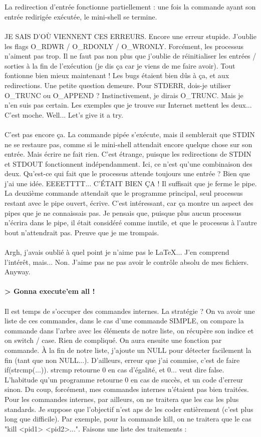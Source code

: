 \\\\
La redirection d'entrée fonctionne partiellement : une fois la commande ayant son entrée redirigée exécutée, le mini-shell se termine.
\\\\
JE SAIS D'OÙ VIENNENT CES ERREURS. Encore une erreur stupide. J'oublie les flags O\_RDWR / O\_RDONLY / O\_WRONLY. Forcément, les processus n'aiment pas trop. Il ne faut pas non plus que j'oublie de réinitialiser les entrées / sorties à la fin de l'exécution (je dis ça car je viens de me faire avoir). Tout fontionne bien mieux maintenant ! Les bugs étaient bien dûs à ça, et aux redirections. Une petite question demeure. Pour STDERR, dois-je utiliser O\_TRUNC ou O\_APPEND ? Instinctivement, je dirais O\_TRUNC. Mais je n'en suis pas certain. Les exemples que je trouve sur Internet mettent les deux... C'est moche. Well... Let's give it a try.
\\\\
C'est pas encore ça. La commande pipée s'exécute, mais il semblerait que STDIN ne se restaure pas, comme si le mini-shell attendait encore quelque chose sur son entrée. Mais écrire ne fait rien. C'est étrange, puisque les redirections de STDIN et STDOUT fonctionnent indépendamment. Ici, ce n'est qu'une combinaison des deux. Qu'est-ce qui fait que le processus attende toujours une entrée ? Bien que j'ai une idée. EEEETTTT... C'ÉTAIT BIEN ÇA ! Il suffisait que je ferme le pipe. La deuxième commande attendait que le programme principal, seul processus restant avec le pipe ouvert, écrive. C'est intéressant, car ça montre un aspect des pipes que je ne connaissais pas. Je pensais que, puisque plus aucun processus n'écrira dans le pipe, il était considéré comme inutile, et que le processus à l'autre bout n'attendrait pas. Preuve que je me trompais.
\\\\
Argh, j'avais oublié à quel point je n'aime pas le \LaTeX... J'en comprend l'intérêt, mais... Non. J'aime pas ne pas avoir le contrôle absolu de mes fichiers. Anyway.
\\\\
\textbf{> Gonna execute'em all !}
\\\\
Il est temps de s'occuper des commandes internes. La stratégie ? On va avoir une liste de ces commandes, dans le cas d'une commande SIMPLE, on compare la commande dans l'arbre avec les éléments de notre liste, on récupère son indice et on switch / case. Rien de compliqué. On aura ensuite une fonction par commande. À la fin de notre liste, j'ajoute un NULL pour détecter facilement la fin (tant que non NULL...). D'ailleurs, erreur que j'ai commise, c'est de faire if(strcmp(...)). strcmp retourne 0 en cas d'égalité, et 0... veut dire false. L'habitude qu'un programme retourne 0 en cas de succès, et un code d'erreur sinon. Du coup, forcément, mes commandes internes n'étaient pas bien traitées. Pour les commandes internes, par ailleurs, on ne traitera que les cas les plus standards. Je suppose que l'objectif n'est aps de les coder entièrement (c'est plus long que difficile). Par exemple, pour la commande kill, on ne traitera que le cas "kill <pid1> <pid2>...". Faisons une liste des traitements :
